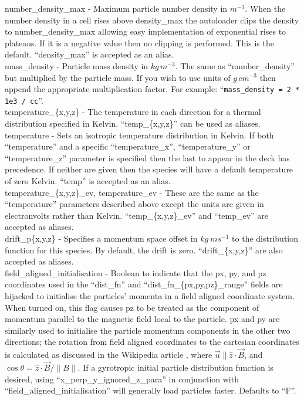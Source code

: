{\emphtext number\_density\_max} - Maximum particle number density in $m^{-3}$.
When the number density in a cell rises above density\_max the
autoloader clips the density to number\_density\_max allowing easy
implementation of exponential rises to plateaus. If it is a negative value
then no clipping is performed. This is the default. ``density\_max'' is accepted
as an alias.\\

{\emphtext mass\_density} - Particle mass density in $kg\,m^{-3}$. The same
as ``number\_density'' but multiplied by the particle mass. If you wish to use
units of $g\,cm^{-3}$ then append the appropriate multiplication factor.
For example: ``\verb|mass_density = 2 * 1e3 / cc|''.\\

{\emphtext temperature\_\{x,y,z\}} - The temperature in each direction for a
thermal distribution specified in Kelvin. ``temp\_\{x,y,z\}'' can be used as
aliases.\\

{\emphtext temperature} - Sets an isotropic temperature distribution in Kelvin.
If both ``temperature'' and a specific ``temperature\_x'', ``temperature\_y''
or ``temperature\_z'' parameter is specified then the last to appear in the
deck has precedence. If neither are given then the species will have a
default temperature of zero Kelvin. ``temp'' is accepted as an alias.\\

{\emphtext temperature\_\{x,y,z\}\_ev, temperature\_ev} - These are the same
as the ``temperature'' parameters described above except the units are given
in electronvolts rather than Kelvin. ``temp\_\{x,y,z\}\_ev'' and ``temp\_ev''
are accepted as aliases.\\

{\emphtext drift\_p\{x,y,z\}} - Specifies a momentum space offset in
$kg\ ms^{-1}$ to the distribution function for this species. By default,
the drift is zero. ``drift\_\{x,y,z\}'' are also accepted as aliases.\\

{\emphtext field\_aligned\_initialisation} - Boolean to indicate that the
px, py, and pz coordinates used in the ``dist\_fn'' and
``dist\_fn\_\{px,py,pz\}\_range'' fields are hijacked to initialise the
particles' momenta in a field aligned coordinate system.
When turned on, this flag causes pz to be treated as the component of
momentum parallel to the magnetic field local to the particle.
px and py are similarly used to initialise the particle momentum
components in the other two directions; the rotation from field
aligned coordinates to the cartesian coordinates is calculated as discussed in
the Wikipedia article \cite{rotmatrix},
where ${\vec u \parallel {\hat z} \cdot {\vec B}}$, and
$\cos\theta = {{\hat z}\cdot{\vec B}} / {\|B\|}$.
If a gyrotropic initial particle distribution function is desired, using
``x\_perp\_y\_ignored\_z\_para'' in conjunction with
``field\_aligned\_initialisation'' will generally load particles faster.
Defaults to ``F''. \\

